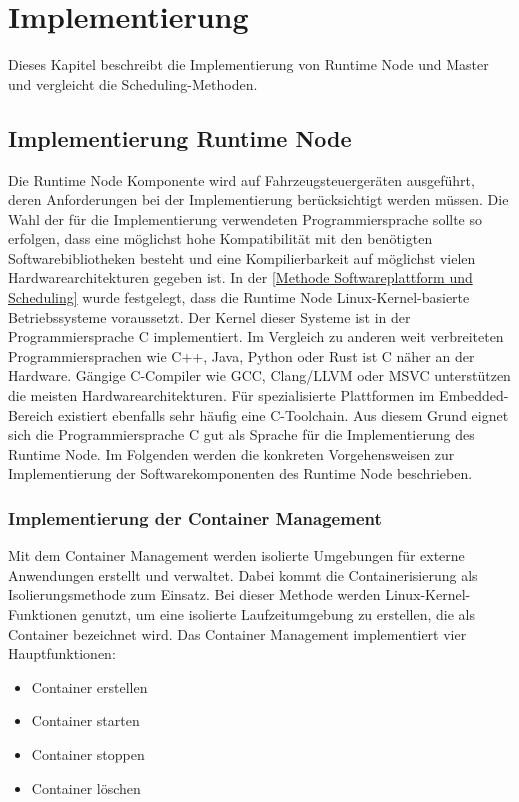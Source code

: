 \chapter{Implementierung}

Dieses Kapitel beschreibt die Implementierung von Runtime Node und Master und vergleicht die Scheduling-Methoden.

\section{Implementierung Runtime Node}

Die Runtime Node Komponente wird auf Fahrzeugsteuergeräten ausgeführt, deren Anforderungen bei der Implementierung berücksichtigt werden müssen. Die Wahl der für die Implementierung verwendeten Programmiersprache sollte so erfolgen, dass eine möglichst hohe Kompatibilität mit den benötigten Softwarebibliotheken besteht und eine Kompilierbarkeit auf möglichst vielen Hardwarearchitekturen gegeben ist. In der \autoref{Methode Softwareplattform und Scheduling} wurde festgelegt, dass die Runtime Node Linux-Kernel-basierte Betriebssysteme voraussetzt. Der Kernel dieser Systeme ist in der Programmiersprache C implementiert. Im Vergleich zu anderen weit verbreiteten Programmiersprachen wie C++, Java, Python oder Rust ist C näher an der Hardware. Gängige C-Compiler wie GCC, Clang/LLVM oder MSVC unterstützen die meisten Hardwarearchitekturen. Für spezialisierte Plattformen im Embedded-Bereich existiert ebenfalls sehr häufig eine C-Toolchain. Aus diesem Grund eignet sich die Programmiersprache C gut als Sprache für die Implementierung des Runtime Node. Im Folgenden werden die konkreten Vorgehensweisen zur Implementierung der Softwarekomponenten des Runtime Node beschrieben.

\subsection{Implementierung der Container Management}

Mit dem Container Management werden isolierte Umgebungen für externe Anwendungen erstellt und verwaltet. Dabei kommt die Containerisierung als Isolierungsmethode zum Einsatz. Bei dieser Methode werden Linux-Kernel-Funktionen genutzt, um eine isolierte Laufzeitumgebung zu erstellen, die als Container bezeichnet wird. Das Container Management implementiert vier Hauptfunktionen:

\begin{itemize}
    \item Container erstellen
    \item Container starten
    \item Container stoppen
    \item Container löschen
\end{itemize}

